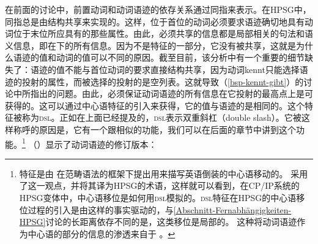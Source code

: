 \noindent
在前面的讨论中，前置动词和动词语迹的依存关系通过同指来表示。在HPSG中，同指总是由结构共享来实现的。这样，位于首位的动词必须要求语迹确切地具有动词位于末位所应具有的那些属性。由此，必须共享的信息都是局部相关的句法和语义信息，即在\localc 下的所有信息。因为\phonc 不是\localc 特征的一部分，它没有被共享，这就是为什么语迹的\phonc 值和动词的值可以不同的原因。截至目前，该分析中有一个重要的细节缺失了：语迹的\localc 值不能与首位动词的要求直接结构共享，因为动词kennt只能选择语迹的投射的属性，而被选择的投射的\subcatlc 是空列表。这就导致（\ref{bsp-kennt-gibt}）的讨论中所指出的问题。由此，必须保证动词语迹的所有信息在它投射的最高点上是可获得的。这可以通过中心语特征的引入来获得，它的值与语迹的\localvc 是相同的。这个特征被称为\textsc{dsl}。正如在上面已经提及的，\textsc{dsl}表示双重斜杠（double slash）。它被这样称呼的原因是，它有一个跟\slashfc 相似的功能，我们可以在后面的章节中讲到这个功能。\footnote{%
特征\dslc 是由 \citet*{Jacobson87}在范畴语法\indexcgc 的框架下提出用来描写英语倒装的中心语移动的。 \citet{Borsley89}采用了这一观点，并将其译为HPSG的术语，这样就可以看到，在CP/IP系统的HPSG变体中，中心语移位是如何用\textsc{dsl}模拟的。\textsc{dsl}特征在HPSG的中心语移位过程的引入是由这样的事实驱动的，与\ref{Abschnitt-Fernabhängigkeiten-HPSG}讨论的长距离依存不同的是，这类移位是局部的。
这种将动词语迹作为中心语的部分的信息的渗透来自于 \citet{Oliva92a}。
}
（）显示了动词语迹的修订版本：
